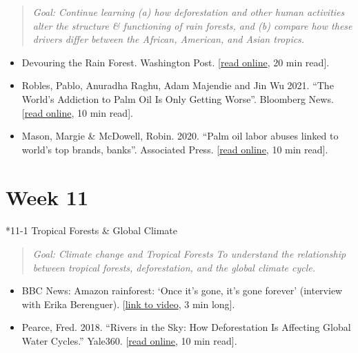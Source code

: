 \documentclass[
  10pt,
  letterpaper,
  oneside,
  open=any]{scrbook}
\makeatletter
\let\oldparagraph\paragraph
\renewcommand{\paragraph}{
    \@ifstar
      \xxxParagraphStar
      \xxxParagraphNoStar
  }
\newcommand{\xxxParagraphStar}[1]{\oldparagraph*{#1}\mbox{}}
\newcommand{\xxxParagraphNoStar}[1]{\oldparagraph{#1}\mbox{}}
\makeatother
\begin{document}
\begin{quote}
\emph{Goal: Continue learning (a) how deforestation and other human
activities alter the structure \& functioning of rain forests, and (b)
compare how these drivers differ between the African, American, and
Asian tropics.}
\end{quote}

\begin{itemize}
\item
  Devouring the Rain Forest. Washington Post.
  {[}\href{https://www.washingtonpost.com/world/interactive/2022/amazon-beef-deforestation-brazil/}{read
  online}, 20 min read{]}.
\item
  Robles, Pablo, Anuradha Raghu, Adam Majendie and Jin Wu 2021. ``The
  World's Addiction to Palm Oil Is Only Getting Worse''. Bloomberg News.
  {[}\href{https://www.bloomberg.com/graphics/2021-palm-oil-deforestation-climate-change/}{read
  online}, 10 min read{]}.
\item
  Mason, Margie \& McDowell, Robin. 2020. ``Palm oil labor abuses linked
  to world's top brands, banks''. Associated Press.
  {[}\href{https://apnews.com/article/virus-outbreak-only-on-ap-indonesia-financial-markets-malaysia-7b634596270cc6aa7578a062a30423bb}{read
  online}, 10 min read{]}.
\end{itemize}

\section*{Week 11}\label{week-11}


\paragraph*{11-1 Tropical Forests \& Global
Climate}\label{tropical-forests-global-climate}

\begin{quote}
\emph{Goal: Climate change and Tropical Forests To understand the
relationship between tropical forests, deforestation, and the global
climate cycle.}
\end{quote}

\begin{itemize}
\item
  BBC News: Amazon rainforest: `Once it's gone, it's gone forever'
  (interview with Erika Berenguer).
  {[}\href{https://www.youtube.com/watch?v=TigV80hwebg}{link to video},
  3 min long{]}.
\item
  Pearce, Fred. 2018. ``Rivers in the Sky: How Deforestation Is
  Affecting Global Water Cycles.'' Yale360.
  {[}\href{https://e360.yale.edu/features/how-deforestation-affecting-global-water-cycles-climate-change}{read
  online}, 10 min read{]}.
\end{itemize}
\end{document}
